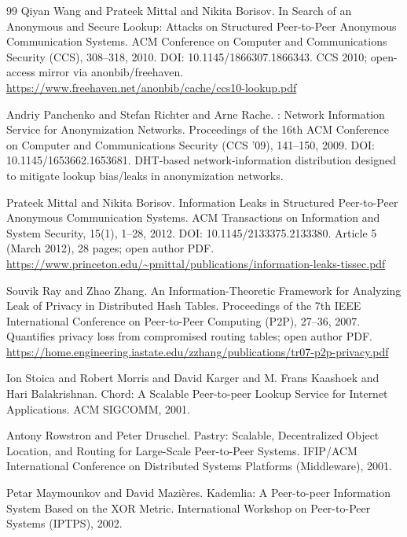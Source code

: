 \documentclass[11pt]{article}
\begin{document}
\begin{thebibliography}{99}
Qiyan Wang and Prateek Mittal and Nikita Borisov.
\newblock In Search of an Anonymous and Secure Lookup: Attacks on Structured Peer-to-Peer Anonymous Communication Systems.
\newblock ACM Conference on Computer and Communications Security (CCS), 308--318, 2010.
\newblock DOI: 10.1145/1866307.1866343.
\newblock CCS 2010; open-access mirror via anonbib/freehaven.
\newblock \url{https://www.freehaven.net/anonbib/cache/ccs10-lookup.pdf}

Andriy Panchenko and Stefan Richter and Arne Rache.
: Network Information Service for Anonymization Networks.
\newblock Proceedings of the 16th {ACM} Conference on Computer and Communications Security (CCS '09), 141--150, 2009.
\newblock DOI: 10.1145/1653662.1653681.
\newblock DHT-based network-information distribution designed to mitigate lookup bias/leaks in anonymization networks.

Prateek Mittal and Nikita Borisov.
\newblock Information Leaks in Structured Peer-to-Peer Anonymous Communication Systems.
\newblock ACM Transactions on Information and System Security, 15(1), 1--28, 2012.
\newblock DOI: 10.1145/2133375.2133380.
\newblock Article 5 (March 2012), 28 pages; open author PDF.
\newblock \url{https://www.princeton.edu/~pmittal/publications/information-leaks-tissec.pdf}

Souvik Ray and Zhao Zhang.
\newblock An Information-Theoretic Framework for Analyzing Leak of Privacy in Distributed Hash Tables.
\newblock Proceedings of the 7th {IEEE} International Conference on Peer-to-Peer Computing (P2P), 27--36, 2007.
\newblock Quantifies privacy loss from compromised routing tables; open author PDF.
\newblock \url{https://home.engineering.iastate.edu/zzhang/publications/tr07-p2p-privacy.pdf}

Ion Stoica and Robert Morris and David Karger and M. Frans Kaashoek and Hari Balakrishnan.
\newblock Chord: A Scalable Peer-to-peer Lookup Service for Internet Applications.
\newblock ACM SIGCOMM, 2001.

Antony Rowstron and Peter Druschel.
\newblock Pastry: Scalable, Decentralized Object Location, and Routing for Large-Scale Peer-to-Peer Systems.
\newblock IFIP/ACM International Conference on Distributed Systems Platforms (Middleware), 2001.

Petar Maymounkov and David Mazi{\`e}res.
\newblock Kademlia: A Peer-to-peer Information System Based on the XOR Metric.
\newblock International Workshop on Peer-to-Peer Systems (IPTPS), 2002.


\end{thebibliography}
\end{document}
